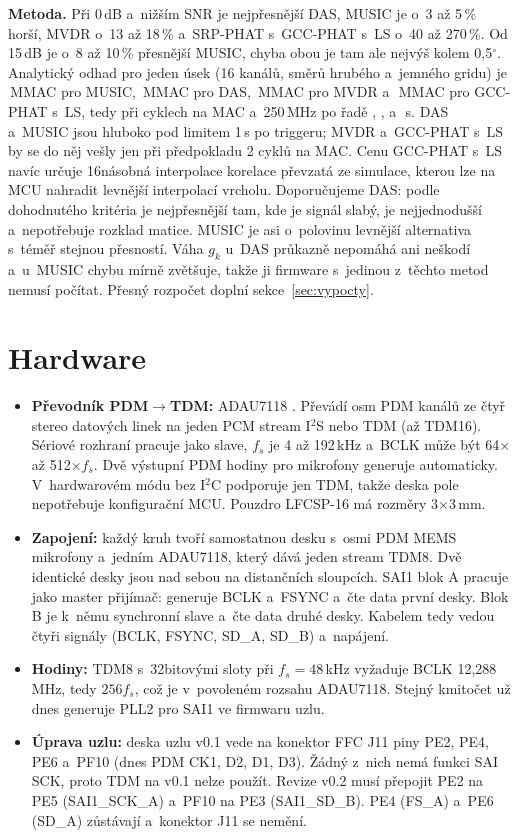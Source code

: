 \documentclass[conference]{IEEEtran}
\begin{document}
\textbf{Metoda.} Při 0\,dB a~nižším SNR je nejpřesnější DAS, MUSIC je o~3 až 5\,\% horší, MVDR o~13 až 18\,\% a~SRP-PHAT s~GCC-PHAT s~LS o~40 až 270\,\%. Od 15\,dB je o~8 až 10\,\% přesnější MUSIC, chyba obou je tam ale nejvýš kolem 0{,}5$^\circ$. Analytický odhad pro jeden úsek (16 kanálů, \macDirections{} směrů hrubého a~jemného gridu) je \macMUSIC\,MMAC pro MUSIC, \macDAS\,MMAC pro DAS, \macMVDR\,MMAC pro MVDR a~\macGCC\,MMAC pro GCC-PHAT s~LS, tedy při \costCyclesPerMac{} cyklech na MAC a~250\,MHz po řadě \timeMUSIC, \timeDAS, \timeMVDR{} a~\timeGCC\,s. DAS a~MUSIC jsou hluboko pod limitem 1\,s po triggeru; MVDR a~GCC-PHAT s~LS by se do něj vešly jen při předpokladu 2 cyklů na MAC. Cenu GCC-PHAT s~LS navíc určuje 16násobná interpolace korelace převzatá ze simulace, kterou lze na MCU nahradit levnější interpolací vrcholu. Doporučujeme DAS: podle dohodnutého kritéria je nejpřesnější tam, kde je signál slabý, je nejjednodušší a~nepotřebuje rozklad matice. MUSIC je asi o~polovinu levnější alternativa s~téměř stejnou přesností. Váha $g_k$ u~DAS průkazně nepomáhá ani neškodí a~u~MUSIC chybu mírně zvětšuje, takže ji firmware s~jedinou z~těchto metod nemusí počítat. Přesný rozpočet doplní sekce~\ref{sec:vypocty}.

\section{Hardware}
\label{sec:hw}
\begin{itemize}
  \item \textbf{Převodník PDM$\rightarrow$TDM:} ADAU7118 \cite{adiadau7118}. Převádí osm PDM kanálů ze čtyř stereo datových linek na jeden PCM stream I$^2$S nebo TDM (až TDM16). Sériové rozhraní pracuje jako slave, $f_s$ je 4 až 192\,kHz a~BCLK může být 64$\times$ až 512$\times f_s$. Dvě výstupní PDM hodiny pro mikrofony generuje automaticky. V~hardwarovém módu bez I$^2$C podporuje jen TDM, takže deska pole nepotřebuje konfigurační MCU. Pouzdro LFCSP-16 má rozměry 3$\times$3\,mm.
  \item \textbf{Zapojení:} každý kruh tvoří samostatnou desku s~osmi PDM MEMS mikrofony a~jedním ADAU7118, který dává jeden stream TDM8. Dvě identické desky jsou nad sebou na distančních sloupcích. SAI1 blok A pracuje jako master přijímač: generuje BCLK a~FSYNC a~čte data první desky. Blok B je k~němu synchronní slave a~čte data druhé desky. Kabelem tedy vedou čtyři signály (BCLK, FSYNC, SD\_A, SD\_B) a~napájení.
  \item \textbf{Hodiny:} TDM8 s~32bitovými sloty při $f_s=48$\,kHz vyžaduje BCLK 12{,}288\,MHz, tedy $256 f_s$, což je v~povoleném rozsahu ADAU7118. Stejný kmitočet už dnes generuje PLL2 pro SAI1 ve firmwaru uzlu.
  \item \textbf{Úprava uzlu:} deska uzlu v0.1 vede na konektor FFC J11 piny PE2, PE4, PE6 a~PF10 (dnes PDM CK1, D2, D1, D3). Žádný z~nich nemá funkci SAI SCK, proto TDM na v0.1 nelze použít. Revize v0.2 musí přepojit PE2 na PE5 (SAI1\_SCK\_A) a~PF10 na PE3 (SAI1\_SD\_B). PE4 (FS\_A) a~PE6 (SD\_A) zůstávají a~konektor J11 se nemění.
\end{itemize}
\end{document}
